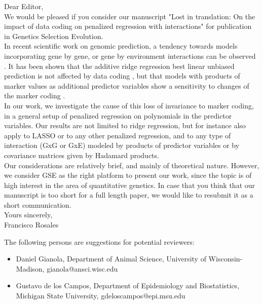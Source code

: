 \documentclass[review]{elsarticle}
\begin{document}
Dear Editor, \\

We would be pleased if you consider our manuscript "Lost in translation: On the impact of data coding
on penalized regression with interactions" for publication in Genetics Selection Evolution.  \\

In recent scientific work on genomic prediction, a tendency towards models incorporating gene by gene, or gene by environment interactions can be observed \cite{ober15,jiang15,martini16,perez17}. 
It has been shown that the additive ridge regression best linear unbiased prediction is not affected by data coding \cite{stranden11,martini17}, but that models with products of marker values as additional predictor variables show a sensitivity to changes of the marker coding \cite{he2016does,martini17}.   \\

In our work, we investigate the cause of this loss of invariance to marker coding, in a general setup of penalized regression on polynomials in the predictor variables. Our results are not limited to ridge regression, but for instance also apply to LASSO or to any other penalized regression, and to any type of interaction (GxG or GxE) modeled by products of predictor variables or by covariance matrices given by Hadamard products. \\

Our considerations are relatively brief, and mainly of theoretical nature. However, we consider GSE as the right platform to present our work, since the topic is of high interest in the area of quantitative genetics. In case that you think that our manuscript is too short for a full length paper, we would like to resubmit it as a short communication. \\


Yours sincerely, \\

Francisco Rosales \\ \vspace{2cm}


The following persons are suggestions for potential reviewers:
\begin{itemize}
	\item Daniel Gianola, Department of Animal Science, University of Wisconsin-Madison, gianola@ansci.wisc.edu 
	\item Gustavo de los Campos, Department of Epidemiology and Biostatistics,
	Michigan State University, gdeloscampos@epi.msu.edu
\end{itemize} 

\[\]



\end{document}
